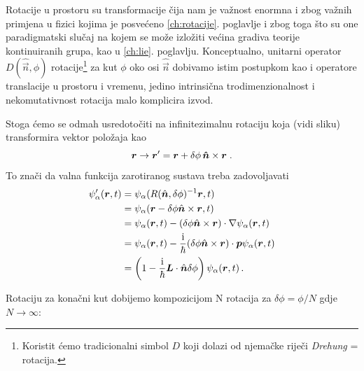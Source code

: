 Rotacije u prostoru su transformacije čija nam je važnost
enormna i zbog važnih primjena u fizici kojima je posvećeno
\ref{ch:rotacije}. poglavlje i zbog toga što su one paradigmatski
slučaj na kojem se može izložiti većina gradiva teorije kontinuiranih grupa,
kao u \ref{ch:lie}. poglavlju.
Konceptualno, unitarni operator $D(\hat{\vec{n}}, \phi)$
rotacije\footnote{Koristit ćemo
  tradicionalni simbol $D$ koji dolazi od njemačke
riječi \emph{Drehung} = rotacija.} za kut $\phi$ oko osi $\hat{\vec{n}}$ dobivamo
istim postupkom kao i operatore translacije u prostoru i vremenu,
jedino intrinsična trodimenzionalnost i nekomutativnost rotacija
malo komplicira izvod.

\vspace{2ex}
\centerline{}

Stoga ćemo se odmah usredotočiti na infinitezimalnu rotaciju koja (vidi sliku)
transformira vektor položaja kao
  \begin{equation}
  \vec{r}\to\vec{r}'=\vec{r}+\delta\phi\, \unitn\times\vec{r}  \;.
 \end{equation}
To znači da valna funkcija zarotiranog
sustava treba zadovoljavati
\begin{equation}
\begin{split}
\psi_{\alpha}'(\vec{r}, t)&=\psi_{\alpha}(R(\hat{\vec{n}},\delta \phi)^{-1}
\vec{r}, t) \\
 &=\psi_{\alpha}(\vec{r}-\delta\phi\hat{\vec{n}}\times\vec{r}, t) \\
 &=\psi_{\alpha}(\vec{r}, t)-(\delta\phi\hat{\vec{n}}\times\vec{r})\cdot
  \nabla\psi_{\alpha}(\vec{r}, t) \\
 &= \psi_{\alpha}(\vec{r}, t)-\frac{\rmi}{\hbar}(\delta\phi\hat{\vec{n}}\times
  \vec{r})\cdot \vec{p}\psi_{\alpha}(\vec{r}, t) \\
 &= \left(1-\frac{\rmi}{\hbar}\vec{L}\cdot\hat{\vec{n}}\delta\phi \right)
  \psi_{\alpha}(\vec{r}, t) \,.
\end{split}
\end{equation}

Rotaciju za konačni kut dobijemo kompozicijom N rotacija za $\delta\phi = \phi / N$
gdje $N\to\infty$: 


